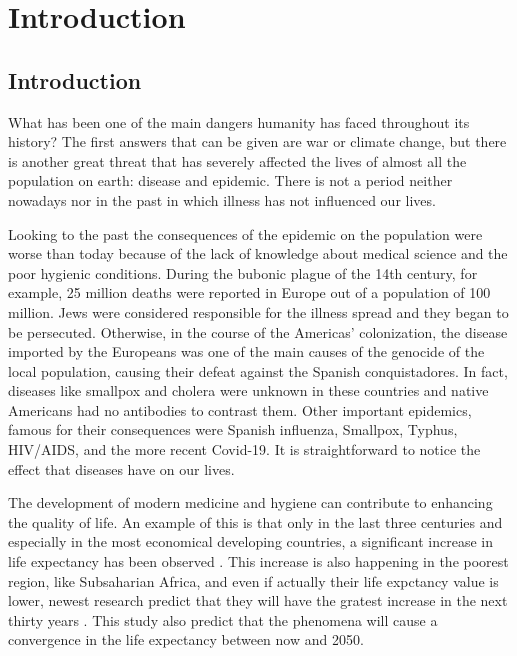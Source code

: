 \part{Introduction}

\chapter{Introduction}

What has been one of the main dangers humanity has faced throughout its history? The first answers that can be given are war or climate change, but there is another great threat that has severely affected the lives of almost all the population on earth: disease and epidemic. There is not a period neither nowadays nor in the past in which illness has not influenced our lives. 

Looking to the past the consequences of the epidemic on the population were worse than today because of the lack of knowledge about medical science and the poor hygienic conditions.  During the bubonic plague of the 14th century, for example, 25 million deaths were reported in Europe out of a population of 100 million. Jews were considered responsible for the illness spread and they began to be persecuted.
Otherwise, in the course of the Americas' colonization, the disease imported by the Europeans was one of the main causes of the genocide of the local population, causing their defeat against the Spanish conquistadores. In fact, diseases like smallpox and cholera were unknown in these countries and native Americans had no antibodies to contrast them. 
Other important epidemics, famous for their consequences were Spanish influenza, Smallpox, Typhus, HIV/AIDS, and the more recent Covid-19. 
It is straightforward to notice the effect that diseases have on our lives.

The development of modern medicine and hygiene can contribute to enhancing the quality of life. An example of this is that only in the last three centuries and especially in the most economical developing countries, a significant increase in life expectancy has been observed \cite{Anderson_82}.
This increase is also happening in the poorest region, like Subsaharian Africa, and even if actually their life expctancy value is lower, newest research predict that they will have the gratest increase in the next thirty years \cite{Vollset_2024}. This study also predict that the phenomena will cause a convergence in the life expectancy between now and 2050.  

